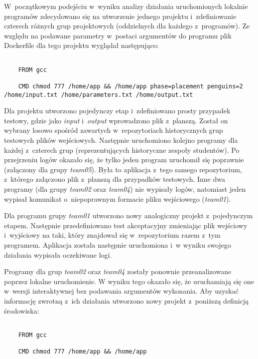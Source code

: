 W~początkowym podejściu w~wyniku analizy działania uruchomionych lokalnie programów zdecydowano się na utworzenie jednego projektu i~zdefiniowanie czterech różnych grup projektowych (oddzielnych dla każdego z~programów).
Ze względu na podawane parametry w~postaci argumentów do programu plik Dockerfile dla tego projektu wyglądał następująco:

{\selectfont
\tiny
\begin{lstlisting}

    FROM gcc

    CMD chmod 777 /home/app && /home/app phase=placement penguins=2 /home/input.txt /home/parameters.txt /home/output.txt

\end{lstlisting}
}

Dla projektu utworzono pojedynczy etap i~zdefiniowano prosty przypadek testowy, gdzie jako \textit{input} i~\textit{output} wprowadzono plik z~planszą.
Został on wybrany losowo spośród zawartych w~repozytoriach historycznych grup testowych plików wejściowych.
Następnie uruchomiono kolejno programy dla każdej z~czterech grup (reprezentujących historyczne zespoły studentów).
Po przejrzeniu logów okazało się, że tylko jeden program uruchomił się poprawnie (załączony dla grupy \textit{team05}).
Była to aplikacja z~tego samego repozytorium, z~którego załączono plik z~planszą dla przypadków testowych.
Inne dwa programy (dla grupy \textit{team02} oraz \textit{team04}) nie wypisały logów, natomiast jeden wypisał komunikat o~niepoprawnym formacie pliku wejściowego (\textit{team01}).

Dla programu grupy \textit{team01} utworzono nowy analogiczny projekt z~pojedynczym etapem.
Następnie przedefiniowano test akceptacyjny zmieniając plik wejściowy i~wyjściowy na taki, który znajdował się w~repozytorium razem z~tym programem.
Aplikacja została następnie uruchomiona i~w wyniku swojego działania wypisała oczekiwane logi.

Programy dla grup \textit{team02} oraz \textit{team04} zostały ponownie przeanalizowane poprzez lokalne uruchomienie.
W wyniku tego okazało się, że uruchamiają się one w~wersji interaktywnej bez podawania argumentów wykonania.
Aby uzyskać informację zwrotną z~ich działania utworzono nowy projekt z~poniższą definicją środowiska:

{\selectfont
\tiny
\begin{lstlisting}

    FROM gcc

    CMD chmod 777 /home/app && /home/app

\end{lstlisting}
}

